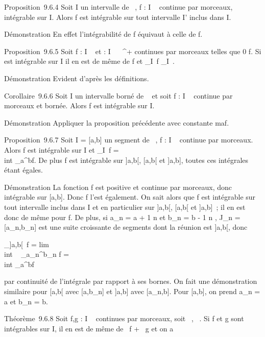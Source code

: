 \documentclass[]{article}
\begin{document}
Proposition~9.6.4 Soit I un intervalle de ~, f : I \rightarrow~  continue par
morceaux, intégrable sur I. Alors f est intégrable sur tout intervalle
I' inclus dans I.

Démonstration En effet l'intégrabilité de f équivaut à celle de
\textbar{}f\textbar{}.

Proposition~9.6.5 Soit f : I \rightarrow~  et \phi : I \rightarrow~ ~^+ continues par
morceaux telles que 0 \leq\textbar{}f\textbar{}\leq \phi. Si \phi est intégrable sur
I il en est de même de f et \left
\textbar{}\int  \_I~f\right
\textbar{}\leq\int  \_I~\phi.

Démonstration Evident d'après les définitions.

Corollaire~9.6.6 Soit I un intervalle borné de ~ et soit f : I \rightarrow~ 
continue par morceaux et bornée. Alors f est intégrable sur I.

Démonstration Appliquer la proposition précédente avec \phi constante
ma\jmathorant \textbar{}f\textbar{}.

Proposition~9.6.7 Soit I = {[}a,b{]} un segment de ~, f : I \rightarrow~  continue
par morceaux. Alors f est intégrable sur I et
\int  \_I~f =\\int
 \_a^bf. De plus f est intégrable sur {]}a,b{[},
{[}a,b{[} et {]}a,b{]}, toutes ces intégrales étant égales.

Démonstration La fonction \textbar{}f\textbar{} est positive et continue
par morceaux, donc intégrable sur {[}a,b{]}. Donc f l'est également. On
sait alors que \textbar{}f\textbar{} est intégrable sur tout intervalle
inclus dans I et en particulier sur {]}a,b{[}, {[}a,b{[} et {]}a,b{]}~;
il en est donc de même pour f. De plus, si a\_n = a + 1
\over n et b\_n = b - 1 \over
n , J\_n = {[}a\_n,b\_n{]} est une suite
croissante de segments dont la réunion est {]}a,b{[}, donc

\int  \_{]}a,b{[}~f
= lim\\int ~
\_a\_n^b\_n f =\\int
 \_a^bf

par continuité de l'intégrale par rapport à ses bornes. On fait une
démonstration similaire pour {[}a,b{[} avec {[}a,b\_n{]} et
{]}a,b{]} avec {[}a\_n,b{]}. Pour {[}a,b{]}, on prend
a\_n = a et b\_n = b.

Théorème~9.6.8 Soit f,g : I \rightarrow~  continues par morceaux, soit \alpha~,\beta~ \in {}. Si
f et g sont intégrables sur I, il en est de même de \alpha~f + \beta~g et on a
\end{document}
